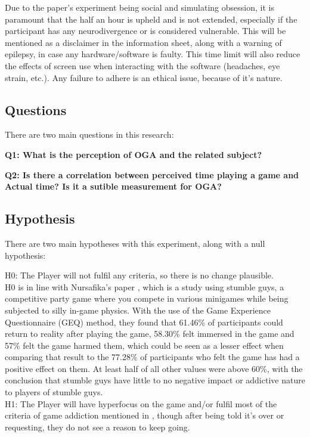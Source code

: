 \documentclass[conference]{IEEEtran}
\begin{document}
Due to the paper's experiment being social and simulating obsession, it is paramount that the half an hour is upheld and is not extended, especially if the participant has any neurodivergence or is considered vulnerable. This will be mentioned as a disclaimer in the information sheet, along with a warning of epilepsy, in case any hardware/software is faulty. This time limit will also reduce the effects of screen use when interacting with the software (headaches, eye strain, etc.). Any failure to adhere is an ethical issue, because of it's nature. \\

\subsection{Questions}
There are two main questions in this research:

 \textbf{Q1: What is the perception of OGA and the related subject?}

 \textbf{Q2: Is there a correlation between perceived time playing a game and Actual time? Is it a sutible measurement for OGA?}\\

\subsection{Hypothesis}
There are two main hypotheses with this experiment, along with a null hypothesis:

H0: The Player will not fulfil any criteria, so there is no change plausible.\\

H0 is in line with Nursafika's paper \cite{Nursafika2024}, which is a study using stumble guys, a competitive party game where you compete in various minigames while being subjected to silly in-game physics. With the use of the Game Experience Questionnaire (GEQ) method, they found that 61.46\% of participants could return to reality after playing the game, 58.30\% felt immersed in the game and 57\% felt the game harmed them, which could be seen as a lesser effect when comparing that result to the 77.28\% of participants who felt the game has had a positive effect on them. At least half of all other values were above 60\%,  with the conclusion that stumble guys have little to no negative impact or addictive nature to players of stumble guys.\\

H1: The Player will have hyperfocus on the game and/or fulfil most of the criteria of game addiction mentioned in \cite{NHSHamp24}, though after being told it's over or requesting, they do not see a reason to keep going.\\
\end{document}
